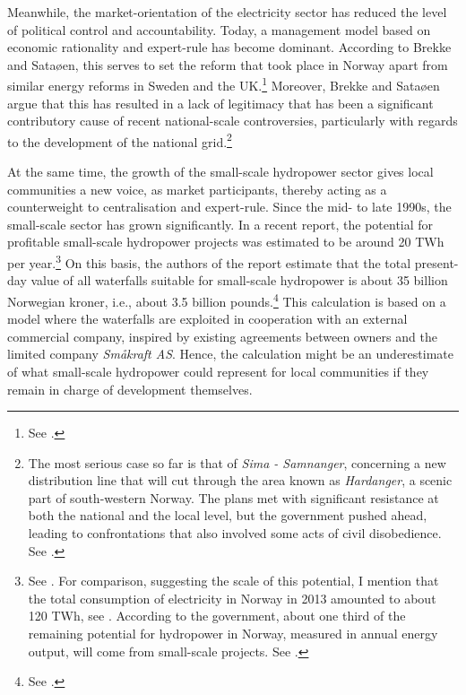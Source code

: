 Meanwhile, the market-orientation of the electricity sector has reduced the level of political control and accountability. Today, a management model based on economic rationality and expert-rule has become dominant. According to Brekke and Sataøen, this serves to set the reform that took place in Norway apart from similar energy reforms in Sweden and the UK.\footnote{See \cite{brekke12}.} Moreover, Brekke and Sataøen argue that this has resulted in a lack of legitimacy that has been a significant contributory cause of recent national-scale controversies, particularly with regards to the development of the national grid.\footnote{The most serious case so far is that of {\it Sima - Samnanger}, concerning a new distribution line that will cut through the area known as {\it Hardanger}, a scenic part of south-western Norway. The plans met with significant resistance at both the national and the local level, but the government pushed ahead, leading to confrontations that also involved some acts of civil disobedience. See \cite[22-23]{brekke12}.}

At the same time, the growth of the small-scale hydropower sector gives local communities a new voice, as market participants, thereby acting as a counterweight to centralisation and expert-rule. Since the mid- to late 1990s, the small-scale sector has grown significantly. In a recent report, the potential for profitable small-scale hydropower projects was estimated to be around 20 TWh per year.\footnote{See \cite{aanesland09}. For comparison, suggesting the scale of this potential, I mention that the total consumption of electricity in Norway in 2013 amounted to about 120 TWh, see \cite{statistikk13}. According to the government, about one third of the remaining potential for hydropower in Norway, measured in annual energy output, will come from small-scale projects. See \cite[231]{nou129}.} On this basis, the authors of the report estimate that the total present-day value of all waterfalls suitable for small-scale hydropower is about 35 billion Norwegian kroner, i.e., about 3.5 billion pounds.\footnote{See \cite[1]{aanesland09}.} This calculation is based on a model where the waterfalls are exploited in cooperation with an external commercial company, inspired by existing agreements between owners and the limited company {\it Småkraft AS}. Hence, the calculation might be an underestimate of what small-scale hydropower could represent for local communities if they remain in charge of development themselves.

